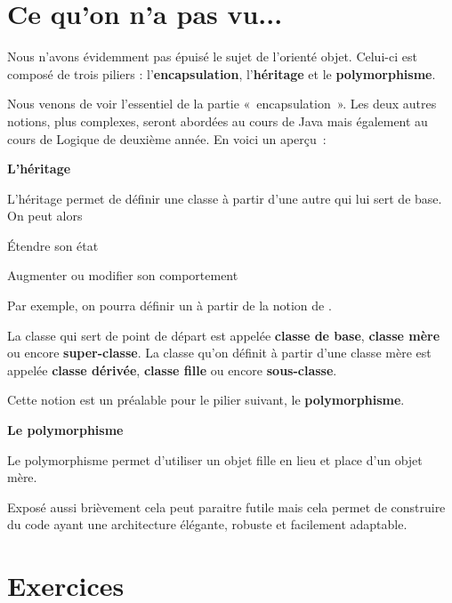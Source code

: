 \section{Ce qu'on n'a pas vu...}

Nous n'avons évidemment pas épuisé le sujet de
l'orienté objet. Celui-ci est composé de trois piliers
: l'\textbf{encapsulation},
l'\textbf{héritage} et le \textbf{polymorphisme}.

Nous venons de voir l'essentiel de la partie
«~encapsulation~». Les deux autres notions, plus complexes, seront
abordées au cours de Java mais également au cours de Logique de
deuxième année. En voici un aperçu~:

{\sffamily\bfseries\upshape
L'héritage}

{L’héritage permet de définir une classe à partir d’une autre qui lui
sert de base.} 
On peut alors

\begin{liste}
	\item {
		Étendre son état}
	\item {
		Augmenter ou modifier son comportement}
\end{liste}

Par exemple, on pourra définir un  à partir
de la notion de .

La classe qui sert de point de départ est appelée \textbf{classe de
base}, \textbf{classe mère} ou encore \textbf{super-classe}. La classe
qu’on définit à partir d’une classe mère est appelée \textbf{classe
dérivée}, \textbf{classe fille} ou encore \textbf{sous-classe}.

Cette notion est un préalable pour le pilier suivant, le
\textbf{polymorphisme}.

{\sffamily\bfseries\upshape
Le polymorphisme}

{
Le polymorphisme permet d’utiliser un objet fille en lieu et place d’un
objet mère.} 

{Exposé aussi brièvement cela peut paraitre futile mais cela
permet de construire du code ayant une architecture élégante, robuste
et facilement adaptable.}


\section{Exercices}

